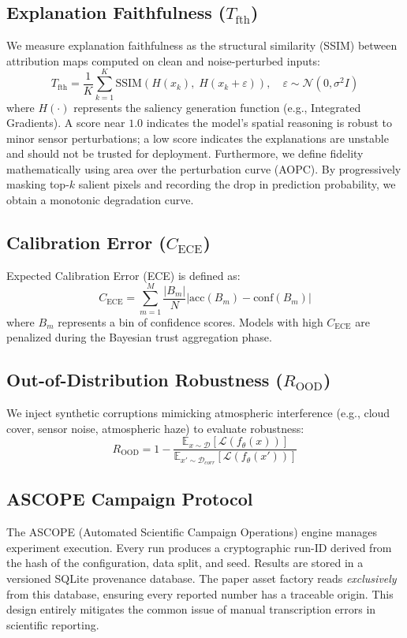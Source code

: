 \documentclass[10pt,journal]{IEEEtran}
\newcommand{\Tfaith}{T_{\mathrm{fth}}}
\newcommand{\Rood}{R_{\mathrm{OOD}}}
\newcommand{\Cscore}{C_{\mathrm{ECE}}}
\begin{document}
\subsection{Explanation Faithfulness ($\Tfaith$)}
We measure explanation faithfulness as the structural similarity (SSIM)
between attribution maps computed on clean and noise-perturbed inputs:
\begin{equation}
\Tfaith = \frac{1}{K} \sum_{k=1}^K \mathrm{SSIM}\!\left(H(x_k),\;
H(x_k + \varepsilon)\right), \quad \varepsilon \sim \mathcal{N}(0,\sigma^2 I)
\end{equation}
where $H(\cdot)$ represents the saliency generation function (e.g., Integrated Gradients).
A score near $1.0$ indicates the model's spatial reasoning is robust to
minor sensor perturbations; a low score indicates the explanations are
unstable and should not be trusted for deployment.
Furthermore, we define fidelity mathematically using area over the perturbation curve (AOPC). By progressively masking top-$k$ salient pixels and recording the drop in prediction probability, we obtain a monotonic degradation curve.

\subsection{Calibration Error ($\Cscore$)}
Expected Calibration Error (ECE) is defined as:
\begin{equation}
\Cscore = \sum_{m=1}^M \frac{|B_m|}{N} |\mathrm{acc}(B_m) - \mathrm{conf}(B_m)|
\end{equation}
where $B_m$ represents a bin of confidence scores. Models with high $\Cscore$ are penalized during the Bayesian trust aggregation phase.

\subsection{Out-of-Distribution Robustness ($\Rood$)}
We inject synthetic corruptions mimicking atmospheric interference (e.g., cloud cover, sensor noise, atmospheric haze) to evaluate robustness:
\begin{equation}
\Rood = 1 - \frac{\mathbb{E}_{x \sim \mathcal{D}}[\mathcal{L}(f_\theta(x))]}{\mathbb{E}_{x' \sim \mathcal{D}_{corr}}[\mathcal{L}(f_\theta(x'))]}
\end{equation}

\subsection{ASCOPE Campaign Protocol}
The ASCOPE (Automated Scientific Campaign Operations) engine manages
experiment execution. Every run produces a cryptographic run-ID derived
from the hash of the configuration, data split, and seed. Results are stored
in a versioned SQLite provenance database. The paper asset factory reads
\emph{exclusively} from this database, ensuring every reported number has
a traceable origin. This design entirely mitigates the common issue of manual transcription errors in scientific reporting.
\end{document}
